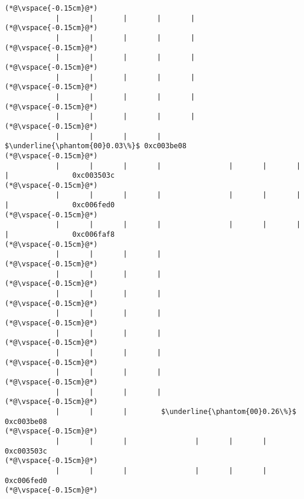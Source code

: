 \begin{lstlisting}[caption=20 viiteparametria Java$\to$C , label=profile:J2CBenchmark00206, numberbychapter=true, frame=lines, float, floatplacement=t]
(*@\vspace{-0.15cm}@*)
            |       |       |       |       |
(*@\vspace{-0.15cm}@*)
            |       |       |       |       |
(*@\vspace{-0.15cm}@*)
            |       |       |       |       |
(*@\vspace{-0.15cm}@*)
            |       |       |       |       |
(*@\vspace{-0.15cm}@*)
            |       |       |       |       |
(*@\vspace{-0.15cm}@*)
            |       |       |       |       |
(*@\vspace{-0.15cm}@*)
            |       |       |       |        $\underline{\phantom{00}0.03\%}$ 0xc003be08
(*@\vspace{-0.15cm}@*)
            |       |       |       |                |       |       |       |               0xc003503c
(*@\vspace{-0.15cm}@*)
            |       |       |       |                |       |       |       |               0xc006fed0
(*@\vspace{-0.15cm}@*)
            |       |       |       |                |       |       |       |               0xc006faf8
(*@\vspace{-0.15cm}@*)
            |       |       |       |
(*@\vspace{-0.15cm}@*)
            |       |       |       |
(*@\vspace{-0.15cm}@*)
            |       |       |       |
(*@\vspace{-0.15cm}@*)
            |       |       |       |
(*@\vspace{-0.15cm}@*)
            |       |       |       |
(*@\vspace{-0.15cm}@*)
            |       |       |       |
(*@\vspace{-0.15cm}@*)
            |       |       |       |
(*@\vspace{-0.15cm}@*)
            |       |       |       |
(*@\vspace{-0.15cm}@*)
            |       |       |        $\underline{\phantom{00}0.26\%}$ 0xc003be08
(*@\vspace{-0.15cm}@*)
            |       |       |                |       |       |               0xc003503c
(*@\vspace{-0.15cm}@*)
            |       |       |                |       |       |               0xc006fed0
(*@\vspace{-0.15cm}@*)

\end{lstlisting}
